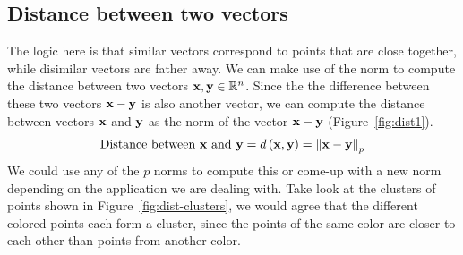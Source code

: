 \subsection{Distance between two vectors}
The logic here is that similar vectors correspond to points that are close together, while disimilar vectors are father away. We can make use of the norm to compute the distance between two vectors $\mathbf{x}, \mathbf{y} \in \mathbb{R}^n$. Since the the difference between these two vectors $\mathbf{x} - \mathbf{y}$ is also another vector, we can compute the distance between vectors $\mathbf{x}$ and $\mathbf{y}$ as the norm of the vector $\mathbf{x} - \mathbf{y}$ (Figure~\ref{fig:dist1}).
\[ \text{Distance between } \mathbf{x} \text{ and } \mathbf{y} = d\left( \mathbf{x}, \mathbf{y}\right) = \left\lVert \mathbf{x} - \mathbf{y} \right\rVert_p \]
We could use any of the $p$ norms to compute this or come-up with a new norm depending on the application we are dealing with. Take look at the clusters of points shown in Figure~\ref{fig:dist-clusters}, we would agree that the different colored points each form a cluster, since the points of the same color are closer to each other than points from another color. 


